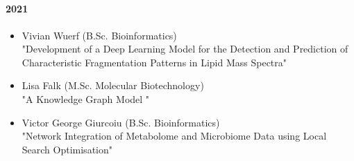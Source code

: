 \subsection{}
\paragraph{2021}
\begin{itemize}
	\item Vivian Wuerf (B.Sc. Bioinformatics)\\
		"Development of a Deep Learning Model for the %
		Detection and Prediction of Characteristic Fragmentation %
		Patterns in Lipid Mass Spectra"
	\item Lisa Falk (M.Sc. Molecular Biotechnology)\\
		"A Knowledge Graph Model "
	\item Victor George Giurcoiu (B.Sc. Bioinformatics)\\
		"Network Integration of Metabolome and Microbiome Data %
		using Local Search Optimisation"
\end{itemize}

